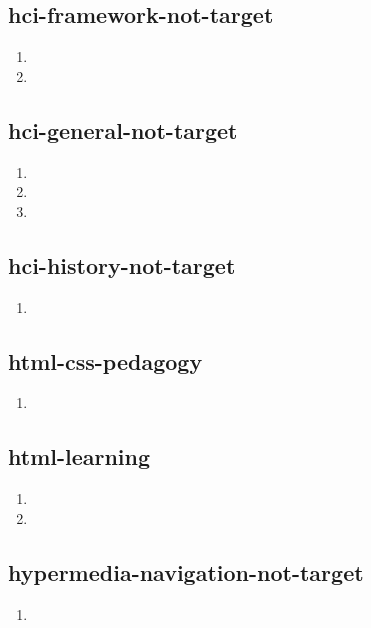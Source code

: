 \documentclass{article}
\begin{document}
\subsection{hci-framework-not-target}
\begin{enumerate}
\item {}
\item {}
\end{enumerate}

\subsection{hci-general-not-target}
\begin{enumerate}
\item {}
\item {}
\item {}
\end{enumerate}

\subsection{hci-history-not-target}
\begin{enumerate}
\item {}
\end{enumerate}

\subsection{html-css-pedagogy}
\begin{enumerate}
\item {}
\end{enumerate}

\subsection{html-learning}
\begin{enumerate}
\item {}
\item {}
\end{enumerate}

\subsection{hypermedia-navigation-not-target}
\begin{enumerate}
\item {}
\end{enumerate}
\end{document}
